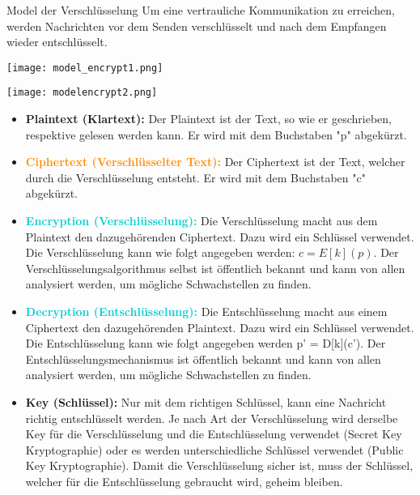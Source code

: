 \begin{concept}{Model der Verschlüsselung}
    Um eine vertrauliche Kommunikation zu erreichen, werden Nachrichten vor dem Senden verschlüsselt und nach dem Empfangen wieder entschlüsselt.

    \begin{minipage}{0.4\linewidth}
    \texttt{[image: model\_encrypt1.png]}
    \end{minipage}
    \begin{minipage}{0.4\linewidth}
    \texttt{[image: modelencrypt2.png]}
    \end{minipage}

    \begin{itemize}
        \item \textcolor{darkcorn}{\textbf{Plaintext (Klartext):}} Der Plaintext ist der Text, so wie er geschrieben, respektive gelesen werden kann. Er wird mit dem Buchstaben "p" abgekürzt.
        \item \textcolor{darkorange}{\textbf{Ciphertext (Verschlüsselter Text):}} Der Ciphertext ist der Text, welcher durch die Verschlüsselung entsteht. Er wird mit dem Buchstaben "c" abgekürzt.
        \item \textcolor{darkturquoise}{\textbf{Encryption (Verschlüsselung):}} Die Verschlüsselung macht aus dem Plaintext den dazugehörenden Ciphertext. Dazu wird ein Schlüssel verwendet. Die Verschlüsselung kann wie folgt angegeben werden: $c=E[k](p)$. Der Verschlüsselungsalgorithmus selbst ist öffentlich bekannt und kann von allen analysiert werden, um mögliche Schwachstellen zu finden.
        \item \textcolor{darkturquoise}{\textbf{Decryption (Entschlüsselung):}} Die Entschlüsselung macht aus einem Ciphertext den dazugehörenden Plaintext. Dazu wird ein Schlüssel verwendet. Die Entschlüsselung kann wie folgt angegeben werden p' = D[k](c'). Der Entschlüsselungsmechanismus ist öffentlich bekannt und kann von allen analysiert werden, um mögliche Schwachstellen zu finden.
        \item \textcolor{darkpink}{\textbf{Key (Schlüssel):}} Nur mit dem richtigen Schlüssel, kann eine Nachricht richtig entschlüsselt werden. Je nach Art der Verschlüsselung wird derselbe Key für die Verschlüsselung und die Entschlüsselung verwendet (Secret Key Kryptographie) oder es werden unterschiedliche Schlüssel verwendet (Public Key Kryptographie). Damit die Verschlüsselung sicher ist, muss der Schlüssel, welcher für die Entschlüsselung gebraucht wird, geheim bleiben.
    \end{itemize}    
\end{concept}

